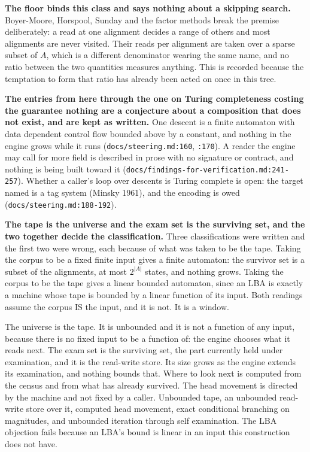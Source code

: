 \textbf{The floor binds this class and says nothing about a skipping search.} Boyer-Moore, Horspool, Sunday and the factor methods break the premise deliberately: a read at one alignment decides a range of others and most alignments are never visited. Their reads per alignment are taken over a sparse subset of \(A\), which is a different denominator wearing the same name, and no ratio between the two quantities measures anything. This is recorded because the temptation to form that ratio has already been acted on once in this tree.

\textbf{The entries from here through the one on Turing completeness costing the guarantee nothing are a conjecture about a composition that does not exist, and are kept as written.} One descent is a finite automaton with data dependent control flow bounded above by a constant, and nothing in the engine grows while it runs (\texttt{docs/\allowbreak{}steering.md:160}, \texttt{:170}). A reader the engine may call for more field is described in prose with no signature or contract, and nothing is being built toward it (\texttt{docs/\allowbreak{}findings-\allowbreak{}for-\allowbreak{}verification.md:241-257}). Whether a caller's loop over descents is Turing complete is open: the target named is a tag system (Minsky 1961), and the encoding is owed (\texttt{docs/\allowbreak{}steering.md:188-192}).

\textbf{The tape is the universe and the exam set is the surviving set, and the two together decide the classification.} Three classifications were written and the first two were wrong, each because of what was taken to be the tape. Taking the corpus to be a fixed finite input gives a finite automaton: the survivor set is a subset of the alignments, at most \(2^{|A|}\) states, and nothing grows. Taking the corpus to be the tape gives a linear bounded automaton, since an LBA is exactly a machine whose tape is bounded by a linear function of its input. Both readings assume the corpus IS the input, and it is not. It is a window.

The universe is the tape. It is unbounded and it is not a function of any input, because there is no fixed input to be a function of: the engine chooses what it reads next. The exam set is the surviving set, the part currently held under examination, and it is the read-write store. Its size grows as the engine extends its examination, and nothing bounds that. Where to look next is computed from the census and from what has already survived. The head movement is directed by the machine and not fixed by a caller. Unbounded tape, an unbounded read-write store over it, computed head movement, exact conditional branching on magnitudes, and unbounded iteration through self examination. The LBA objection fails because an LBA's bound is linear in an input this construction does not have.

